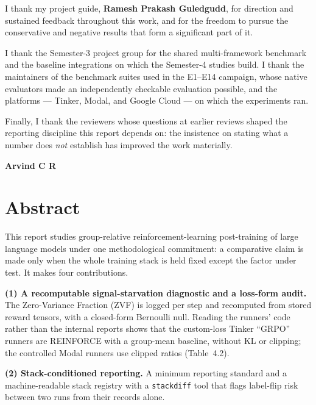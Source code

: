 \documentclass[12pt,a4paper]{report}
\begin{document}
I thank my project guide, \textbf{Ramesh Prakash Guledgudd}, for direction and
sustained feedback throughout this work, and for the freedom to pursue the
conservative and negative results that form a significant part of it.

I thank the Semester-3 project group for the shared multi-framework benchmark
and the baseline integrations on which the Semester-4 studies build. I thank
the maintainers of the benchmark suites used in the E1--E14 campaign, whose
native evaluators made an independently checkable evaluation possible, and the
platforms --- Tinker, Modal, and Google Cloud --- on which the experiments ran.

Finally, I thank the reviewers whose questions at earlier reviews shaped the
reporting discipline this report depends on: the insistence on stating what a
number does \emph{not} establish has improved the work materially.

\vspace{0.3in}
\noindent\textbf{Arvind C R}

\chapter*{Abstract}
\thispagestyle{plain}

This report studies group-relative reinforcement-learning post-training of
large language models under one methodological commitment: a comparative
claim is made only when the whole training stack is held fixed except the
factor under test. It makes four contributions.

\textbf{(1) A recomputable signal-starvation diagnostic and a loss-form
audit.} The Zero-Variance Fraction (ZVF) is logged per step and recomputed
from stored reward tensors, with a closed-form Bernoulli null. Reading the
runners' code rather than the internal reports shows that the custom-loss
Tinker ``GRPO'' runners are REINFORCE with a group-mean baseline, without KL
or clipping; the controlled Modal runners use clipped ratios (Table~4.2).

\textbf{(2) Stack-conditioned reporting.} A minimum reporting standard and a
machine-readable stack registry with a \texttt{stackdiff} tool that flags
label-flip risk between two runs from their records alone.
\end{document}

